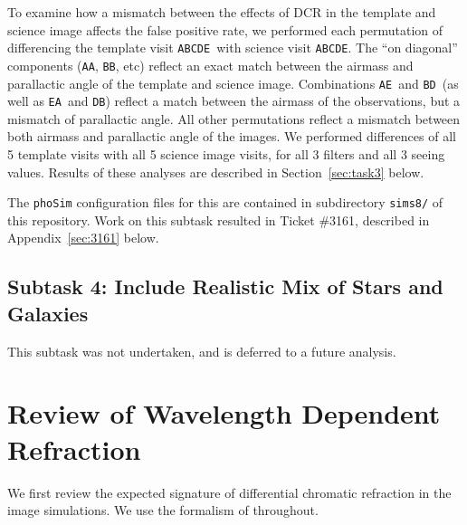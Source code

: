 \documentclass[prd, nofootinbib, floatfix, 11pt, tightenlines, times]{article}
\def\A{{\tt A}}
\def\B{{\tt B}}
\def\C{{\tt C}}
\def\D{{\tt D}}
\def\E{{\tt E}}
\begin{document}
To examine how a mismatch between the effects of DCR in the template
and science image affects the false positive rate, we performed each
permutation of differencing the template visit \A\B\C\D\E\ with
science visit \A\B\C\D\E.  The ``on diagonal'' components (\A\A, \B\B,
etc) reflect an exact match between the airmass and parallactic angle
of the template and science image.  Combinations \A\E\ and \B\D\ (as
well as \E\A\ and \D\B) reflect a match between the airmass of the
observations, but a mismatch of parallactic angle.  All other
permutations reflect a mismatch between both airmass and parallactic
angle of the images.  We performed differences of all 5 template
visits with all 5 science image visits, for all 3 filters and all 3
seeing values.  Results of these analyses are described in
Section~\ref{sec:task3} below.

The {\tt phoSim} configuration files for this are contained in
subdirectory {\tt sims8/} of this repository.  Work on this subtask
resulted in Ticket \#3161, described in Appendix~\ref{sec:3161} below.

\subsection{Subtask 4: Include Realistic Mix of Stars and Galaxies}

This subtask was not undertaken, and is deferred to a future analysis.

\section{Review of Wavelength Dependent Refraction \label{sec:theory}}

We first review the expected signature of differential chromatic
refraction in the image simulations.  We use the formalism of
\cite{1982PASP...94..715F} throughout.
\end{document}

